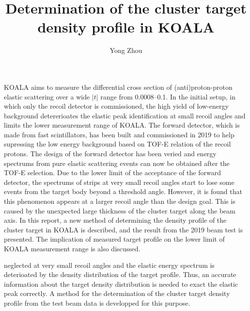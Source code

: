 \documentclass[fleqn,twocolumn,a4paper]{ikpar}
\begin{document}
\parindent=0pt
\frenchspacing

\title{{\bf
    Determination of the cluster target density profile in KOALA
}}
\author{Yong Zhou
}

\maketitle

KOALA aims to measure the differential cross section of (anti)proton-proton elastic
scattering over a wide $|t|$ range from \SIrange{0.0008}{0.1}{\tmom}.
In the initial setup, in which only the recoil detector is commissioned, the high yield of low-energy
background detererioates the elastic peak identification at small recoil angles and limits the lower measurement range of KOALA.
The forward detector, which is made from fast scintillators, has been built and
commissioned in 2019 to help supressing the low energy background based on TOF-E
relation of the recoil protons.
The design of the forward detector has been veried and energy spectrums from pure elastic scattering events can now be obtained after the TOF-E selection.
Due to the lower limit of the acceptance of the forward detector, the spectrums
of strips at very small recoil angles start to lose some events from the
target body beyond a threshold angle.
However, it is found that this phenomenon appears at a larger recoil angle than the design goal.
This is caused by the unexpected large thickness of the cluster target along the beam axis.
In this report, a new method of determining the density profile of the cluster
target in KOALA is described, and the result from the 2019 beam test is
presented.
The implication of measured target profile on the lower limit of KOALA measurement range is also discussed.


neglected at very small recoil angles and the elastic energy spectrum is deterioated by the density distribution of the target profile.
Thus, an accurate information about the target density distribution is needed to exact
the elastic peak correctly.
A method for the determination of the cluster target density profile from the
test beam data is developped for this purpose.
\par
\medskip
\end{document}
